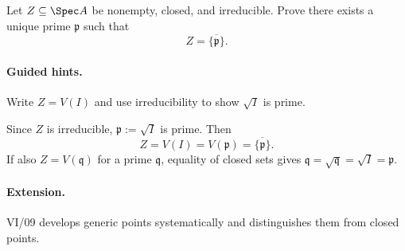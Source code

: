 \begin{problem}
Let $Z\subseteq\Spec A$ be nonempty, closed, and irreducible.  Prove there exists a unique
prime $\mathfrak p$ such that
\[
Z=\overline{\{\mathfrak p\}}.
\]
\end{problem}
\paragraph{Guided hints.}
Write $Z=V(I)$ and use irreducibility to show $\sqrt I$ is prime.
\begin{solution}
Since $Z$ is irreducible, $\mathfrak p:=\sqrt I$ is prime.  Then
\[
Z=V(I)=V(\mathfrak p)=\overline{\{\mathfrak p\}}.
\]
If also $Z=V(\mathfrak q)$ for a prime $\mathfrak q$, equality of closed sets gives
$\mathfrak q=\sqrt{\mathfrak q}=\sqrt I=\mathfrak p$.
\end{solution}
\paragraph{Extension.}
VI/09 develops generic points systematically and distinguishes them from closed points.
